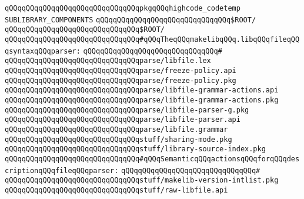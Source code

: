 \verb|qQQqqQQqqQQqqQQqqQQqqQQqqQQqqQQqpkgqQQqhighcode_codetemp|\newline
\newline
\verb|SUBLIBRARY_COMPONENTS|\newline
\newline
\verb|qQQqqQQqqQQqqQQqqQQqqQQqqQQqqQQq$ROOT/|\newline
\verb|qQQqqQQqqQQqqQQqqQQqqQQqqQQqqQQq$ROOT/|\newline
\newline
\verb|qQQqqQQqqQQqqQQqqQQqqQQqqQQqqQQq#qQQqTheqQQqmakelibqQQq.libqQQqfileqQQqsyntaxqQQqparser:|\newline
\verb|qQQqqQQqqQQqqQQqqQQqqQQqqQQqqQQq#|\newline
\verb|qQQqqQQqqQQqqQQqqQQqqQQqqQQqqQQqparse/libfile.lex|\newline
\verb|qQQqqQQqqQQqqQQqqQQqqQQqqQQqqQQqparse/freeze-policy.api|\newline
\verb|qQQqqQQqqQQqqQQqqQQqqQQqqQQqqQQqparse/freeze-policy.pkg|\newline
\verb|qQQqqQQqqQQqqQQqqQQqqQQqqQQqqQQqparse/libfile-grammar-actions.api|\newline
\verb|qQQqqQQqqQQqqQQqqQQqqQQqqQQqqQQqparse/libfile-grammar-actions.pkg|\newline
\verb|qQQqqQQqqQQqqQQqqQQqqQQqqQQqqQQqparse/libfile-parser-g.pkg|\newline
\verb|qQQqqQQqqQQqqQQqqQQqqQQqqQQqqQQqparse/libfile-parser.api|\newline
\verb|qQQqqQQqqQQqqQQqqQQqqQQqqQQqqQQqparse/libfile.grammar|\newline
\newline
\verb|qQQqqQQqqQQqqQQqqQQqqQQqqQQqqQQqstuff/sharing-mode.pkg|\newline
\verb|qQQqqQQqqQQqqQQqqQQqqQQqqQQqqQQqstuff/library-source-index.pkg|\newline
\newline
\verb|qQQqqQQqqQQqqQQqqQQqqQQqqQQqqQQq#qQQqSemanticqQQqactionsqQQqforqQQqdescriptionqQQqfileqQQqparser:|\newline
\verb|qQQqqQQqqQQqqQQqqQQqqQQqqQQqqQQq#|\newline
\verb|qQQqqQQqqQQqqQQqqQQqqQQqqQQqqQQqstuff/makelib-version-intlist.pkg|\newline
\verb|qQQqqQQqqQQqqQQqqQQqqQQqqQQqqQQqstuff/raw-libfile.api|\newline
